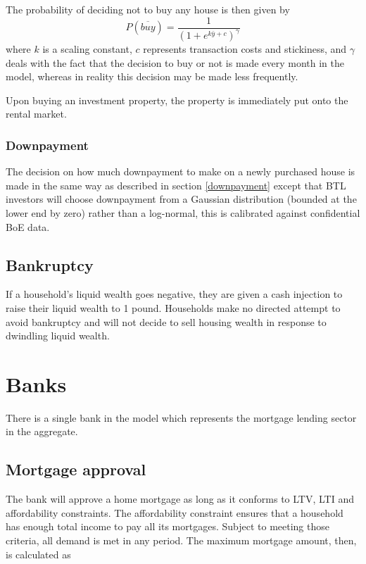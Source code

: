 \documentclass{report}
\begin{document}
The probability of deciding not to buy any house is then given by
\begin{equation}
P(\overline{buy}) = \frac{1}{(1 + e^{k\bar{y}+c})^\gamma}
\end{equation}
where $k$ is a scaling constant, $c$ represents transaction costs and stickiness, and $\gamma$ deals with the fact that the decision to buy or not is made every month in the model, whereas in reality this decision may be made less frequently.

Upon buying an investment property, the property is immediately put onto the rental market.

\subsubsection{Downpayment}
The decision on how much downpayment to make on a newly purchased house is made in the same way as described in section \ref{downpayment} except that BTL investors will choose downpayment from a Gaussian distribution (bounded at the lower end by zero) rather than a log-normal, this is calibrated against confidential BoE data.

\subsection{Bankruptcy}
If a household's liquid wealth goes negative, they are given a cash injection to raise their liquid wealth to 1 pound. Households make no directed attempt to avoid bankruptcy and will not decide to sell housing wealth in response to dwindling liquid wealth.

\section{Banks}

There is a single bank in the model which represents the mortgage lending
sector in the aggregate.

\subsection{Mortgage approval}
The bank will approve a home mortgage as long as it
conforms to LTV, LTI and affordability constraints. The affordability
constraint ensures that a household has enough total income to pay all its
mortgages. Subject to meeting those criteria, all demand is met in any
period. The maximum mortgage amount, then, is calculated as
\end{document}
